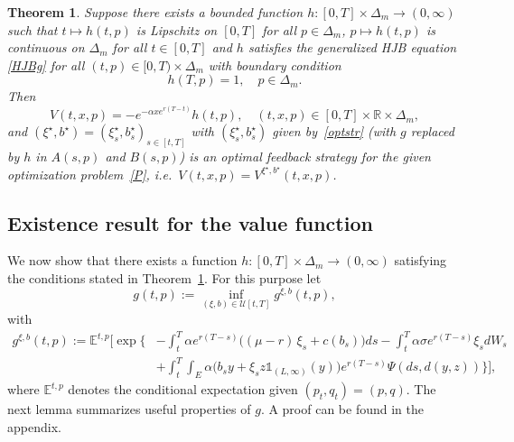 \documentclass[reqno, 11pt]{amsart}%
\newcommand{\R}{\mathbb{R}}
\newcommand{\Eop}{\mathbb{E}}
\newtheorem{theorem}{Theorem}
\theoremstyle{definition}
\numberwithin{equation}{section} \numberwithin{theorem}{section}
\begin{document}
\begin{theorem}\label{veri}
	Suppose there exists a bounded function $h:[0,T]\times\Delta_m\to(0,\infty)$ such that $t\mapsto h(t,p)$ is Lipschitz on $[0,T]$ for all $p\in\Delta_m$, $p\mapsto h(t,p)$ is continuous on $\Delta_m$ for all $t\in[0,T]$ and $h$ satisfies the generalized HJB equation \eqref{HJBg}	for all $(t,p)\in[0,T)\times\Delta_m$ with boundary condition
	\begin{equation}\label{hHJBbcond}
	h(T,p) = 1,\quad p\in\Delta_m.
	\end{equation}
	Then
	\begin{equation*}
	V(t,x,p)= -e^{-\alpha x e^{r(T-t)}}h(t,p),\quad (t,x,p)\in[0,T]\times\R\times\Delta_m,
	\end{equation*}
	and  $(\xi^\star,b^\star)=(\xi^\star_s,b^\star_s)_{s\in[t,T]}$ with $(\xi^\star_s,b^\star_s)$ given by~\eqref{optstr} (with $g$ replaced by $h$ in $A(s,p)$ and $B(s,p)$) is an optimal feedback strategy for the given optimization problem~\eqref{P}, i.e.\ $V(t,x,p) = V^{\xi^\star,b^\star}(t,x,p)$.
\end{theorem}


\subsection{Existence result for the value function}
\label{existencevalue}

We now show that there exists a function $h:[0,T]\times\Delta_m\to(0,\infty)$ satisfying the conditions stated in Theorem~\ref{veri}. For this purpose let 
\begin{equation}\label{g}
g(t,p) := \inf_{(\xi,b)\in{\mathcal U}[t,T]}g^{\xi,b}(t,p),
\end{equation}
with
\begin{equation}\label{gxib}
\begin{aligned}
g^{\xi,b}(t,p) := \Eop^{t,p}\bigg[\exp\bigg\{&-\int_t^T \alpha e^{r(T-s)}\big((\mu-r)\,\xi_s+c(b_s)\big)ds -\int_t^T\alpha\sigma e^{r(T-s)}\xi_sdW_s\\
&+\int_t^T \int_E \alpha \big( b_s y + \xi_s z \mathds{1}_{(L,\infty)}(y)\big)e^{r(T-s)}\Psi(ds, d(y,z))\bigg\}\bigg],
\end{aligned}
\end{equation}
where $\Eop^{t,p}$ denotes the conditional expectation given $(p_t,q_t)=(p,q)$. The next lemma summarizes useful properties of $g$. A proof can be found in the appendix.
\end{document}
